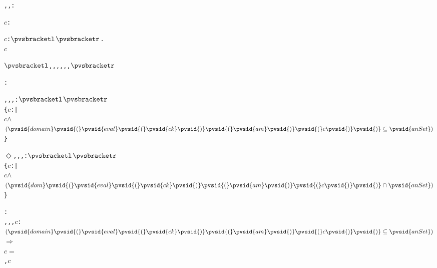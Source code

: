 \begin{alltt}
  \pvsid{(}, , \pvsid{)}: \vspace*{\pvsdeclspacing}

  \pvsid{(}\pvsid{)}\pvsid{(}\pvsid{)}\pvsid{(}\(c\)\pvsid{)}: \vspace*{\pvsdeclspacing}

  \pvsid{[||]}\pvsid{(}\pvsid{)}\pvsid{(}\pvsid{)}\pvsid{(}\(c\)\pvsid{)}: \({\pvsbracketl}\)\({\pvsbracketr}\). \pvskey{=}
      \pvsid{(}\pvsid{(}\pvsid{)}\pvsid{(}\pvsid{)}\pvsid{(}\(c\)\pvsid{)}\pvsid{)}\vspace*{\pvsdeclspacing}

   \({\pvsbracketl}\), , \pvsid{\{||\}}, , , , \pvsid{[||]}\({\pvsbracketr}\)

  :  \vspace*{\pvsdeclspacing}

  \pvsid{(}, , , \pvsid{)}: \({\pvsbracketl}\)\({\pvsbracketr}\) \pvskey{=}
      \{\(c\):  |
          \pvsid{\{||\}}\pvsid{(}\pvsid{)}\pvsid{(}\(c\)\pvsid{)} \(\wedge\)
           \(\setsothersubsetothertwofn{\pvsid{domain}\pvsid{(}\pvsid{eval}\pvsid{(}\pvsid{ck}\pvsid{)}\pvsid{(}\pvsid{am}\pvsid{)}\pvsid{(}c\pvsid{)}\pvsid{)}}{\pvsid{anSet}}\)\}\vspace*{\pvsdeclspacing}

  \(\Diamond\)\pvsid{(}, , , \pvsid{)}: \({\pvsbracketl}\)\({\pvsbracketr}\) \pvskey{=}
      \{\(c\):  |
          \pvsid{\{||\}}\pvsid{(}\pvsid{)}\pvsid{(}\(c\)\pvsid{)} \(\wedge\)
           \pvsid{(}\(\setsotherintersectiontwofn{\pvsid{dom}\pvsid{(}\pvsid{eval}\pvsid{(}\pvsid{ck}\pvsid{)}\pvsid{(}\pvsid{am}\pvsid{)}\pvsid{(}c\pvsid{)}\pvsid{)}}{\pvsid{anSet}}\)\pvsid{)}\}\vspace*{\pvsdeclspacing}

  : 
     , , , \(c\):
      \(\setsothersubsetothertwofn{\pvsid{domain}\pvsid{(}\pvsid{eval}\pvsid{(}\pvsid{ck}\pvsid{)}\pvsid{(}\pvsid{am}\pvsid{)}\pvsid{(}c\pvsid{)}\pvsid{)}}{\pvsid{anSet}}\) \(\Rightarrow\)
       \pvsid{(}\pvsid{[||]}\pvsid{(}\pvsid{)}\pvsid{(}\pvsid{)}\pvsid{(}\(c\)\pvsid{)} \(=\)
          \pvsid{[||]}\pvsid{(}\pvsid{)}\pvsid{(}\pvsid{(}, \pvsid{)}\pvsid{)}\pvsid{(}\(c\)\pvsid{)}\pvsid{)}\vspace*{\pvsdeclspacing}


\end{alltt}

